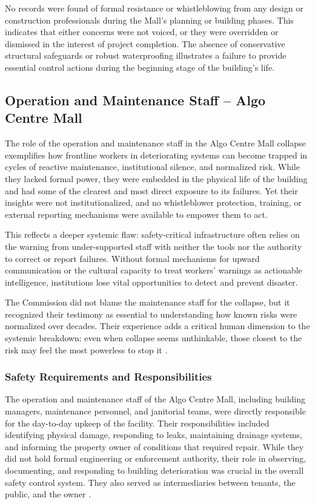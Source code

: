 \documentclass[12pt]{article}
\begin{document}
No records were found of formal resistance or whistleblowing from any design or construction professionals during the Mall’s planning or building phases. This indicates that either concerns were not voiced, or they were overridden or dismissed in the interest of project completion. The absence of conservative structural safeguards or robust waterproofing illustrates a failure to provide essential control actions during the beginning stage of the building’s life.

\subsection{Operation and Maintenance Staff – Algo Centre Mall}
The role of the operation and maintenance staff in the Algo Centre Mall collapse exemplifies how frontline workers in deteriorating systems can become trapped in cycles of reactive maintenance, institutional silence, and normalized risk. While they lacked formal power, they were embedded in the physical life of the building and had some of the clearest and most direct exposure to its failures. Yet their insights were not institutionalized, and no whistleblower protection, training, or external reporting mechanisms were available to empower them to act.

This reflects a deeper systemic flaw: safety-critical infrastructure often relies on the warning from under-supported staff with neither the tools nor the authority to correct or report failures. Without formal mechanisms for upward communication or the cultural capacity to treat workers’ warnings as actionable intelligence, institutions lose vital opportunities to detect and prevent disaster.

The Commission did not blame the maintenance staff for the collapse, but it recognized their testimony as essential to understanding how known risks were normalized over decades. Their experience adds a critical human dimension to the systemic breakdown: even when collapse seems unthinkable, those closest to the risk may feel the most powerless to stop it \cite[237–243]{AlgoLakeReport1}.

\subsubsection*{Safety Requirements and Responsibilities}

The operation and maintenance staff of the Algo Centre Mall, including building managers, maintenance personnel, and janitorial teams, were directly responsible for the day-to-day upkeep of the facility. Their responsibilities included identifying physical damage, responding to leaks, maintaining drainage systems, and informing the property owner of conditions that required repair. While they did not hold formal engineering or enforcement authority, their role in observing, documenting, and responding to building deterioration was crucial in the overall safety control system. They also served as intermediaries between tenants, the public, and the owner \cite[p237–243]{AlgoLakeReport1}.
\end{document}
